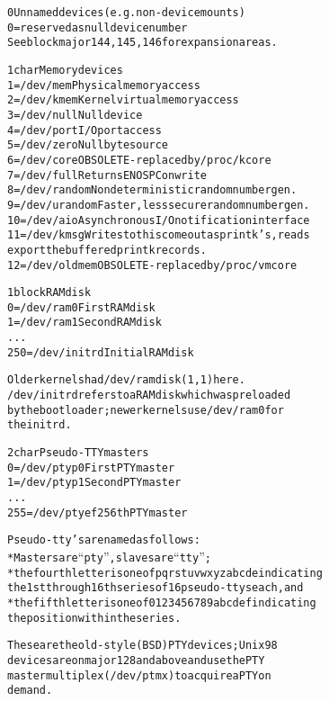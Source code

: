 \documentclass[a4paper,8pt,english]{sphinxmanual}
\begin{document}
\begin{alltt}
   0            Unnamed devices (e.g. non-device mounts)
                  0 = reserved as null device number
                See block major 144, 145, 146 for expansion areas.

   1 char       Memory devices
                  1 = /dev/mem          Physical memory access
                  2 = /dev/kmem         Kernel virtual memory access
                  3 = /dev/null         Null device
                  4 = /dev/port         I/O port access
                  5 = /dev/zero         Null byte source
                  6 = /dev/core         OBSOLETE - replaced by /proc/kcore
                  7 = /dev/full         Returns ENOSPC on write
                  8 = /dev/random       Nondeterministic random number gen.
                  9 = /dev/urandom      Faster, less secure random number gen.
                 10 = /dev/aio          Asynchronous I/O notification interface
                 11 = /dev/kmsg         Writes to this come out as printk's, reads
                                        export the buffered printk records.
                 12 = /dev/oldmem       OBSOLETE - replaced by /proc/vmcore

   1 block      RAM disk
                  0 = /dev/ram0         First RAM disk
                  1 = /dev/ram1         Second RAM disk
                    ...
                250 = /dev/initrd       Initial RAM disk

                Older kernels had /dev/ramdisk (1, 1) here.
                /dev/initrd refers to a RAM disk which was preloaded
                by the boot loader; newer kernels use /dev/ram0 for
                the initrd.

   2 char       Pseudo-TTY masters
                  0 = /dev/ptyp0        First PTY master
                  1 = /dev/ptyp1        Second PTY master
                    ...
                255 = /dev/ptyef        256th PTY master

                Pseudo-tty's are named as follows:
                * Masters are ``pty'', slaves are ``tty'';
                * the fourth letter is one of pqrstuvwxyzabcde indicating
                  the 1st through 16th series of 16 pseudo-ttys each, and
                * the fifth letter is one of 0123456789abcdef indicating
                  the position within the series.

                These are the old-style (BSD) PTY devices; Unix98
                devices are on major 128 and above and use the PTY
                master multiplex (/dev/ptmx) to acquire a PTY on
                demand.


\end{alltt}
\end{document}
